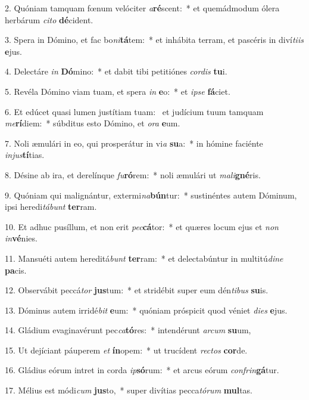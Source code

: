 2. Quóniam tamquam fœnum velóciter \textit{a}\textbf{ré}scent:~*  et quemádmodum ólera herbárum \textit{ci}\textit{to} \textbf{dé}cident.\

3. Spera in Dómino, et fac bo\textit{ni}\textbf{tá}tem:~*  et inhábita terram, et pascéris in diví\textit{ti}\textit{is} \textbf{e}jus.\

4. Delectáre \textit{in} \textbf{Dó}mino:~*  et dabit tibi petitiónes \textit{cor}\textit{dis} \textbf{tu}i.\

5. Revéla Dómino viam tuam, et spera \textit{in} \textbf{e}o:~*  et \textit{ip}\textit{se} \textbf{fá}ciet.\

6. Et edúcet quasi lumen justítiam tuam: \dag\  et judícium tuum tamquam \textit{me}\textbf{rí}diem:~*  súbditus esto Dómino, et \textit{o}\textit{ra} \textbf{e}um.\

7. Noli æmulári in eo, qui prosperátur in vi\textit{a} \textbf{su}a:~*  in hómine faciénte \textit{in}\textit{jus}\textbf{tí}tias.\

8. Désine ab ira, et derelínque \textit{fu}\textbf{ró}rem:~*  noli æmulári ut \textit{ma}\textit{li}\textbf{gné}ris.\

9. Quóniam qui malignántur, extermi\textit{na}\textbf{bún}tur:~*  sustinéntes autem Dóminum, ipsi heredi\textit{tá}\textit{bunt} \textbf{ter}ram.\

10. Et adhuc pusíllum, et non erit \textit{pec}\textbf{cá}tor:~*  et quæres locum ejus et \textit{non} \textit{in}\textbf{vé}nies.\

11. Mansuéti autem hereditá\textit{bunt} \textbf{ter}ram:~*  et delectabúntur in multitú\textit{di}\textit{ne} \textbf{pa}cis.\

12. Observábit peccá\textit{tor} \textbf{jus}tum:~*  et stridébit super eum dén\textit{ti}\textit{bus} \textbf{su}is.\

13. Dóminus autem irridé\textit{bit} \textbf{e}um:~*  quóniam próspicit quod véniet \textit{di}\textit{es} \textbf{e}jus.\

14. Gládium evaginavérunt pec\textit{ca}\textbf{tó}res:~*  intendérunt \textit{ar}\textit{cum} \textbf{su}um,\

15. Ut dejíciant páuperem \textit{et} \textbf{ín}opem:~*  ut trucídent \textit{rec}\textit{tos} \textbf{cor}de.\

16. Gládius eórum intret in corda \textit{ip}\textbf{só}rum:~*  et arcus eórum \textit{con}\textit{frin}\textbf{gá}tur.\

17. Mélius est módi\textit{cum} \textbf{jus}to,~*  super divítias pecca\textit{tó}\textit{rum} \textbf{mul}tas.\

